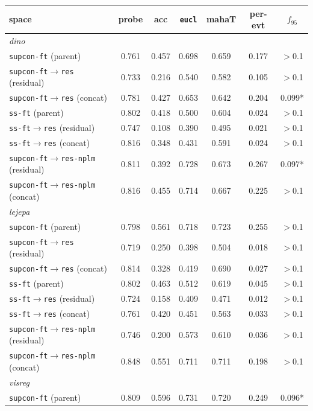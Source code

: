 \documentclass{article}
\begin{document}
\begin{table}[p]\centering\small
\setlength{\tabcolsep}{4pt}
\begin{tabular}{lcccccc}
\toprule
space & probe & acc & \texttt{eucl} & mahaT & per-evt & $f_{95}$ \\
\midrule
\multicolumn{7}{l}{\emph{dino}}\\
\texttt{supcon-ft} (parent) & 0.761 & 0.457 & 0.698 & 0.659 & 0.177 & $>$0.1 \\
\texttt{supcon-ft$\to$res} (residual) & 0.733 & 0.216 & 0.540 & 0.582 & 0.105 & $>$0.1 \\
\texttt{supcon-ft$\to$res} (concat) & 0.781 & 0.427 & 0.653 & 0.642 & 0.204 & 0.099* \\
\texttt{ss-ft} (parent) & 0.802 & 0.418 & 0.500 & 0.604 & 0.024 & $>$0.1 \\
\texttt{ss-ft$\to$res} (residual) & 0.747 & 0.108 & 0.390 & 0.495 & 0.021 & $>$0.1 \\
\texttt{ss-ft$\to$res} (concat) & 0.816 & 0.348 & 0.431 & 0.591 & 0.024 & $>$0.1 \\
\texttt{supcon-ft$\to$res-nplm} (residual) & 0.811 & 0.392 & 0.728 & 0.673 & 0.267 & 0.097* \\
\texttt{supcon-ft$\to$res-nplm} (concat) & 0.816 & 0.455 & 0.714 & 0.667 & 0.225 & $>$0.1 \\
\multicolumn{7}{l}{\emph{lejepa}}\\
\texttt{supcon-ft} (parent) & 0.798 & 0.561 & 0.718 & 0.723 & 0.255 & $>$0.1 \\
\texttt{supcon-ft$\to$res} (residual) & 0.719 & 0.250 & 0.398 & 0.504 & 0.018 & $>$0.1 \\
\texttt{supcon-ft$\to$res} (concat) & 0.814 & 0.328 & 0.419 & 0.690 & 0.027 & $>$0.1 \\
\texttt{ss-ft} (parent) & 0.802 & 0.463 & 0.512 & 0.619 & 0.045 & $>$0.1 \\
\texttt{ss-ft$\to$res} (residual) & 0.724 & 0.158 & 0.409 & 0.471 & 0.012 & $>$0.1 \\
\texttt{ss-ft$\to$res} (concat) & 0.761 & 0.420 & 0.451 & 0.563 & 0.033 & $>$0.1 \\
\texttt{supcon-ft$\to$res-nplm} (residual) & 0.746 & 0.200 & 0.573 & 0.610 & 0.036 & $>$0.1 \\
\texttt{supcon-ft$\to$res-nplm} (concat) & 0.848 & 0.551 & 0.711 & 0.711 & 0.198 & $>$0.1 \\
\multicolumn{7}{l}{\emph{visreg}}\\
\texttt{supcon-ft} (parent) & 0.809 & 0.596 & 0.731 & 0.720 & 0.249 & 0.096* \\

\end{tabular}
\end{table}
\end{document}
